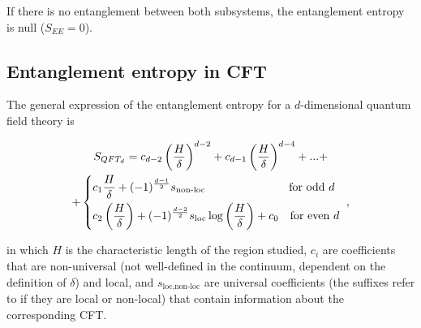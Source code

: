 \documentclass[twocolumn]{revtex4}
\providecommand{\eq}[2]{
    \begin{equation}
        #2
    \label{eq:#1}
    \end{equation}
}
\providecommand{\eqgat}[2]{
    \begin{gather}
        #2
    \label{eq:#1}
    \end{gather}
}
\begin{document}
If there is no entanglement between both subsystems, the entanglement entropy is null ($S_{EE} = 0$).


\subsection{Entanglement entropy in CFT} \label{ss:EE_CFT}

The general expression of the entanglement entropy for a $d$-dimensional quantum field theory is

\eqgat{EE}{
    S_{QFT_d} = c_{d-2} \left( \frac{H}{\delta} \right) ^{d-2} + c_{d-1} \left( \frac{H}{\delta} \right) ^{d-4} + ... + \nonumber \\
    + \begin{dcases}
        c_1 \frac{H}{\delta} + (-1)^{\frac{d-1}{2}} s_{\text{non-loc}}
        \qquad \qquad \qquad \quad \ \text{for odd } d \\
        c_2 \left ( \frac{H}{\delta} \right ) + (-1)^{\frac{d-2}{2}} s_{\text{loc}} \log \left ( \frac{H}{\delta} \right ) + c_0
        \quad \text{for even } d
    \end{dcases} \ ,
}
\cite{nishioka_entanglement_2018} in which $H$ is the characteristic length of the region studied, $c_i$ are coefficients that are non-universal (not well-defined in the continuum, dependent on the definition of $\delta$) and local, and $s_{\text{loc},\text{non-loc}}$ are universal coefficients (the suffixes refer to if they are local or non-local) that contain information about the corresponding CFT.
\end{document}
